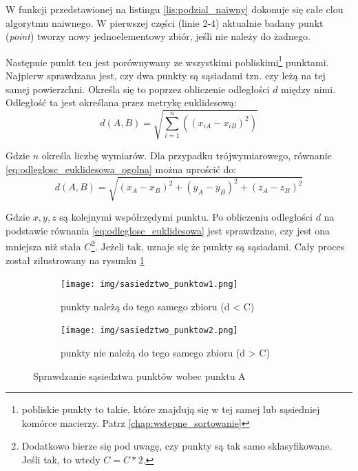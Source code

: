 W funkcji przedstawionej na listingu \ref{lis:podzial_naiwny} dokonuje się całe clou algorytmu naiwnego.
W pierwszej części (linie 2-4) aktualnie badany punkt (\textit{point}) tworzy nowy jednoelementowy zbiór,
jeśli nie należy do żadnego.

Następnie punkt ten jest porównywany ze wszystkimi pobliskimi\footnote{pobliskie punkty to takie,
które znajdują się w tej samej lub sąsiedniej komórce macierzy. Patrz \autoref{chap:wstepne_sortowanie}}
punktami. Najpierw sprawdzana jest, czy dwa punkty są sąsiadami tzn. czy leżą na tej samej powierzchni. 
Określa się to poprzez obliczenie odległości $d$ między nimi. Odległość ta jest określana przez metrykę euklidesową:
\begin{equation} \label{eq:odleglosc_euklidesowa_ogolna}
    d(A,B) = \sqrt{\sum\limits_{i=1}^n((x_{iA}-x_{iB})^2)}
\end{equation}

\noindent Gdzie $n$ określa liczbę wymiarów. Dla przypadku trójwymiarowego, równanie \ref{eq:odleglosc_euklidesowa_ogolna} można uprościć do:
\begin{equation} \label{eq:odleglosc_euklidesowa}
    d(A,B) = \sqrt{(x_A - x_B)^2 + (y_A - y_B)^2 + (z_A - z_B)^2}
\end{equation}

Gdzie $x, y, z$ są kolejnymi współrzędymi punktu. Po obliczeniu odległości $d$ na podstawie równania \ref{eq:odleglosc_euklidesowa}
jest sprawdzane, czy jest ona mniejsza niż stała $C$\footnote{Dodatkowo bierze się pod uwagę, czy punkty są tak samo sklasyfikowane.
Jeśli tak, to wtedy $C = C*2$.}. Jeżeli tak, uznaje się że punkty są sąsiadami. Cały proces został zilustrowany na
rysunku \ref{fig:sprawdzanie_sasiedztwa}

\begin{figure}[h!]
    \centering
    \begin{subfigure}[b]{0.3\textwidth}
        \texttt{[image: img/sasiedztwo\_punktow1.png]}
        \caption {punkty należą do tego samego zbioru (d < C)}
    \end{subfigure}
    \quad
    \begin{subfigure}[b]{0.3\textwidth}
        \texttt{[image: img/sasiedztwo\_punktow2.png]}
        \caption {punkty nie należą do tego samego zbioru (d > C)}
    \end{subfigure}%
    \caption{Sprawdzanie sąsiedztwa punktów wobec punktu A}
    \label{fig:sprawdzanie_sasiedztwa}
\end{figure}


